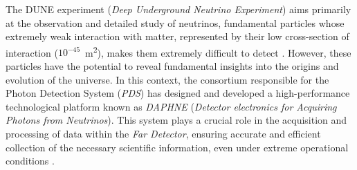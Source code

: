 



The DUNE experiment (\textit{Deep Underground Neutrino Experiment}) aims primarily at the observation and detailed study of neutrinos, fundamental particles whose extremely weak interaction with matter, represented by their low cross-section of interaction ($10^{-45}$\SI{}{\meter^2}), makes them extremely difficult to detect \cite{Mishra1990}. However, these particles have the potential to reveal fundamental insights into the origins and evolution of the universe. In this context, the consortium responsible for the Photon Detection System (\textit{PDS}) has designed and developed a high-performance technological platform known as \textit{DAPHNE} (\textit{Detector electronics for Acquiring Photons from Neutrinos}). This system plays a crucial role in the acquisition and processing of data within the \textit{Far Detector}, ensuring accurate and efficient collection of the necessary scientific information, even under extreme operational conditions \cite{Abi2020}. %



